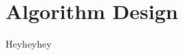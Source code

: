 \documentclass[../../dd.tex]{subfiles}
\begin{document}
	\chapter{Algorithm Design}

	Heyheyhey
\end{document}
